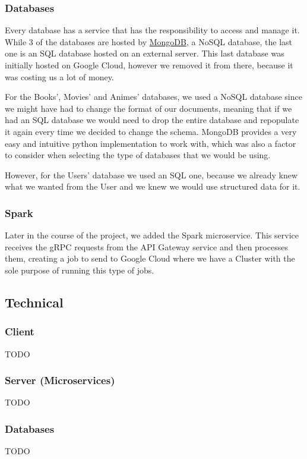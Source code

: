 \documentclass[oneside]{article}
\newcommand*\fpar{\hspace{1ex}}
\begin{document}
    \subsubsection{Databases}
    \fpar Every database has a service that has the responsibility to access and manage it. While 3 of the databases are hosted by \href{https://www.mongodb.com/}{MongoDB}, a NoSQL database, the last one is an SQL database hosted on an external server. This last database was initially hosted on Google Cloud, however we removed it from there, because it was costing us a lot of money.
    \par For the Books', Movies' and Animes' databases, we used a NoSQL database since we might have had to change the format of our documents, meaning that if we had an SQL database we would need to drop the entire database and repopulate it again every time we decided to change the schema. MongoDB provides a very easy and intuitive python implementation to work with, which was also a factor to consider when selecting the type of databases that we would be using.
    \par However, for the Users' database we used an SQL one, because we already knew what we wanted from the User and we knew we would use structured data for it.

    \subsubsection{Spark}
    \fpar Later in the course of the project, we added the Spark microservice. This service receives the gRPC requests from the API Gateway service and then processes them, creating a job to send to Google Cloud where we have a Cluster with the sole purpose of running this type of jobs.

  \subsection{Technical}
    \subsubsection{Client}
    \fpar TODO

    \subsubsection{Server (Microservices)}
    \fpar TODO

    \subsubsection{Databases}
    \fpar TODO
\end{document}
